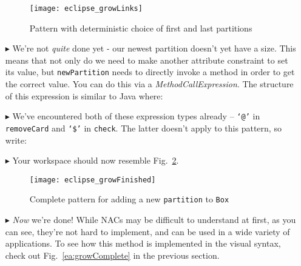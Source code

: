 \begin{itemize}
\begin{figure}[htp]
\begin{center}
  \texttt{[image: eclipse\_growLinks]}
  \caption{Pattern  with deterministic choice of first and last partitions}
  \label{eclipse:growAllLinks}
\end{center}
\end{figure}

\item[$\blacktriangleright$] We're not \emph{quite} done yet - our newest partition doesn't yet have a size. This means that not only do we need to make
another attribute constraint to set its value, but \texttt{newPartition} needs to directly invoke a method in order to get the correct value. You can do this
via a \emph{MethodCallExpression}. The structure of this expression is similar to Java where:

\item[$\blacktriangleright$] We've encountered both of these expression types already -- \texttt{`@'} in \texttt{removeCard} and \texttt{`\$'} in
\texttt{check}. The latter doesn't apply to this pattern, so write: 

\item[$\blacktriangleright$] Your workspace should now resemble Fig.~\ref{eclipse:patternComplete}.

\vspace{0.5cm}

\begin{figure}[htp]
\begin{center}
  \texttt{[image: eclipse\_growFinished]}
  \caption{Complete pattern for adding a new \texttt{partition} to \texttt{Box}}
  \label{eclipse:patternComplete}
\end{center}
\end{figure}

\vspace{0.5cm}

\item[$\blacktriangleright$] \emph{Now} we're done! While NACs may be difficult to understand at first, as you can see, they're not hard to implement, and
can be used in a wide variety of applications. To see how this method is implemented in the visual syntax, check out Fig.~\ref{ea:growComplete} in the
previous section.

\end{itemize}